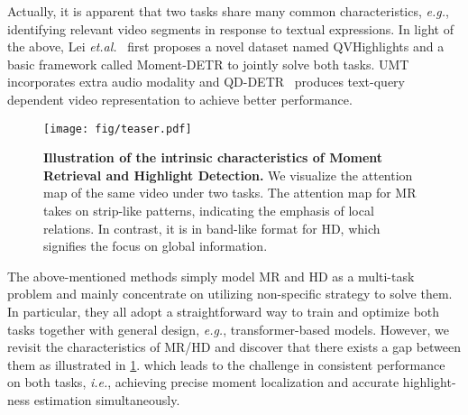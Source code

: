 Actually, it is apparent that two tasks share many common characteristics, \textit{e.g.}, identifying relevant video segments in response to textual expressions.   
In light of the above, Lei \textit{et.al.}~\cite{momentdetr} first proposes a novel dataset named QVHighlights and a basic framework called Moment-DETR to jointly solve both tasks.
UMT~\cite{umt} incorporates extra audio modality and QD-DETR~\cite{qddetr} produces text-query dependent video representation to achieve better performance.
\begin{figure}
    \centering
    \texttt{[image: fig/teaser.pdf]}
    \caption{\textbf{Illustration of the intrinsic characteristics of Moment Retrieval and Highlight Detection.} We visualize the attention map of the same video under two tasks. 
    The attention map for MR takes on strip-like patterns, indicating the emphasis of local relations. In contrast, it is in band-like format for HD, which signifies the focus on global information.}
    \label{fig:teaser}
    \vspace{-10pt}
\end{figure}
The above-mentioned methods simply model MR and HD as a multi-task problem and mainly concentrate on utilizing non-specific strategy to solve them. 
In particular, they all adopt a straightforward way to train and optimize both tasks together with general design, \textit{e.g.}, transformer-based models.
However, we revisit the characteristics of MR/HD and discover that there exists a gap between them as illustrated in \cref{fig:teaser}. 
which leads to  
the challenge in consistent performance on both tasks, \textit{i.e.}, achieving precise moment localization and accurate highlight-ness estimation simultaneously.

